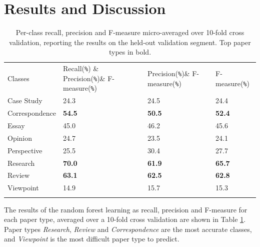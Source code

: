 \documentclass{svmult}
\begin{document}
\vspace{-15pt}
\section{Results and Discussion}
\label{sec:3}
\vspace{-15pt}


\begin{table}

\vspace{-10pt}
\caption{Per-class recall, precision and F-measure micro-averaged over 10-fold cross validation, reporting the results on the held-out validation segment. Top paper types in bold.}

\begin{tabular}{p{2.4cm}p{2.0cm}p{2.0cm}p{2.5cm}}
\hline\noalign{\smallskip}
Classes & Recall(\verb|%|) & Precision(\verb|%|)& F-measure(\verb|%|) \\
\noalign{\smallskip}\svhline\noalign{\smallskip}
Case Study      &   24.3    &    24.5     &   24.4 \\
Correspondence  &   {\bf  54.5}    &    {\bf 50.5}    &    {\bf 52.4} \\ 
Essay           &   45.0     &   46.2    &    45.6 \\
Opinion         &   24.7    &    23.5  &      24.1 \\   
Perspective     &   25.5  &      30.4  &       27.7 \\
Research        &   {\bf 70.0}    &    {\bf 61.9}    &    {\bf 65.7} \\
Review          &  {\bf 63.1}     &   {\bf 62.5}     &   {\bf 62.8} \\
Viewpoint       &     14.9     &   15.7  &      15.3 \\
\noalign{\smallskip}\hline\noalign{\smallskip}
\end{tabular}


\vspace{-20pt}
\label{tab:recallPrecision}       %
\end{table}

The results of the random forest learning as recall, precision and F-measure
for each paper type, averaged over a 10-fold cross validation are shown in Table
\ref{tab:recallPrecision}. Paper types {\em Research}, {\em Review} and {\em
Correspondence} are the most accurate classes, and {\em Viewpoint} is the most
difficult paper type to predict. 
\end{document}
